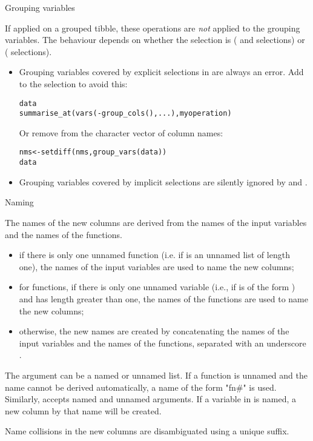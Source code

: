 \documentclass[a4paper]{book}
\begin{document}
\begin{Section}{Grouping variables}


If applied on a grouped tibble, these operations are \emph{not} applied
to the grouping variables. The behaviour depends on whether the
selection is  ( and  selections) or
 ( selections).
\begin{itemize}

\item{} Grouping variables covered by explicit selections in
 are always an error. Add  to the
 selection to avoid this:

\begin{alltt}data %>%
  summarise_at(vars(-group_cols(), ...), myoperation)
\end{alltt}


Or remove  from the character vector of column names:

\begin{alltt}nms <- setdiff(nms, group_vars(data))
data %>% summarise_at(nms, myoperation)
\end{alltt}

\item{} Grouping variables covered by implicit selections are silently
ignored by  and .

\end{itemize}

\end{Section}
%
\begin{Section}{Naming}


The names of the new columns are derived from the names of the
input variables and the names of the functions.
\begin{itemize}

\item{} if there is only one unnamed function (i.e. if  is an unnamed list
of length one),
the names of the input variables are used to name the new columns;
\item{} for  functions, if there is only one unnamed variable (i.e.,
if  is of the form ) and  has length
greater than one,
the names of the functions are used to name the new columns;
\item{} otherwise, the new names are created by
concatenating the names of the input variables and the names of the
functions, separated with an underscore .

\end{itemize}


The  argument can be a named or unnamed list.
If a function is unnamed and the name cannot be derived automatically,
a name of the form "fn\#" is used.
Similarly,  accepts named and unnamed arguments.
If a variable in  is named, a new column by that name will be created.

Name collisions in the new columns are disambiguated using a unique suffix.
\end{Section}
\end{document}
